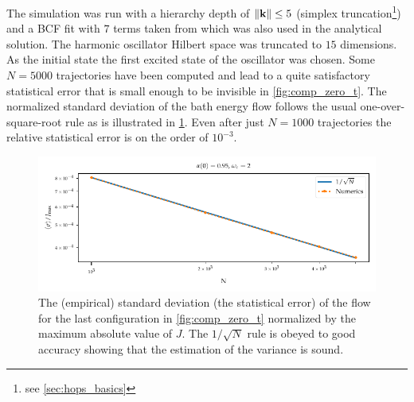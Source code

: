 The simulation was run with a hierarchy depth of \(\norm{\vb{k}} \leq 5\)
(simplex truncation\footnote{see \cref{sec:hops_basics}}) and a BCF
fit with \(7\) terms taken from \cite{RichardDiss} which was also used
in the analytical solution. The harmonic oscillator Hilbert space was
truncated to \(15\) dimensions. As the initial state the first excited
state of the oscillator was chosen. Some \(N=5000\) trajectories have
been computed and lead to a quite satisfactory statistical error that
is small enough to be invisible in \cref{fig:comp_zero_t}. The
normalized standard deviation of the bath energy flow follows the
usual one-over-square-root rule as is illustrated in
\cref{fig:sqrt_conv}. Even after just \(N=1000\) trajectories the
relative statistical error is on the order of \(10^{-3}\).
\begin{figure}[htp]
  \centering
  \includegraphics{figs/analytic_comp/sqrt_convergence.pdf}
  \caption{\label{fig:sqrt_conv} The (empirical) standard deviation
    (the statistical error) of the flow for the last configuration in
    \cref{fig:comp_zero_t} normalized by the maximum absolute value of
    \(J\). The \(1/\sqrt{N}\) rule is obeyed to good accuracy showing
    that the estimation of the variance is sound.}
\end{figure}
